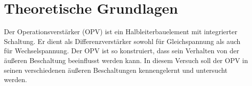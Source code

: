 \newpage					%



\section{Theoretische Grundlagen}
Der Operationsverstärker (OPV) ist ein Halbleiterbauelement mit integrierter Schaltung. Er dient als
Differenzverstärker sowohl für Gleichspannung als auch für Wechselspannung. Der OPV ist so konstruiert, 
dass sein Verhalten von der äußeren Beschaltung beeinflusst werden kann. In diesem Versuch soll der OPV 
in seinen verschiedenen äußeren Beschaltungen kennengelernt und untersucht werden.
